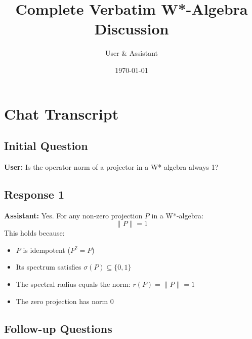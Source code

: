\documentclass{article}
\begin{document}
\title{Complete Verbatim W*-Algebra Discussion}
\author{User \& Assistant}
\date{\today}
\maketitle

\section*{Chat Transcript}

\subsection*{Initial Question}

\textbf{User:} Is the operator norm of a projector in a W* algebra always 1?

\subsection*{Response 1}

\textbf{Assistant:} Yes. For any non-zero projection $P $ in a W*-algebra: 
\begin{equation*}
\|P\| = 1 
\end{equation*}
This holds because:

\begin{itemize}
\item $P $ is idempotent ($P^2 = P $)

\item Its spectrum satisfies $\sigma(P) \subseteq \{0,1\} $

\item The spectral radius equals the norm: $r(P) = \|P\| = 1 $

\item The zero projection has norm 0
\end{itemize}

\subsection*{Follow-up Questions}
\end{document}
